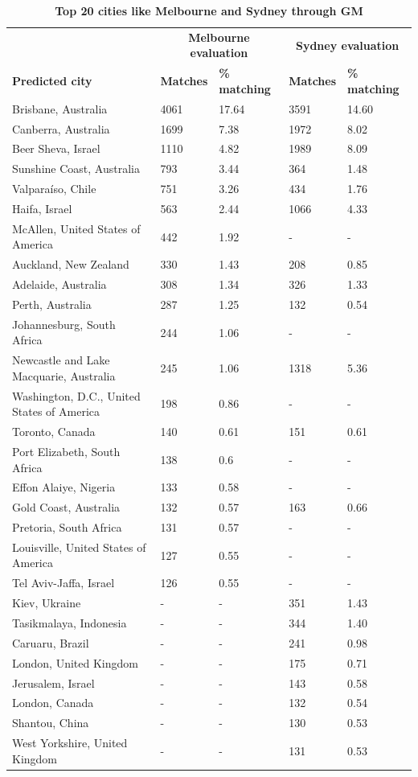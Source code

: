\documentclass[10pt,letterpaper]{article}
\begin{document}
\begin{table}[!htbp]
\begin{adjustwidth}{-2.25in}{0in}
\caption{\bf Top 20 cities like Melbourne and Sydney through GM \label{tab:melbournesydneyGM}}     
\begin{tabular}{ l l l l l}
 \hline    &  \multicolumn{2}{c}{\textbf{Melbourne evaluation}} & \multicolumn{2}{c}{\textbf{Sydney evaluation}}  \\  
\textbf{Predicted city} & \textbf{Matches} & \textbf{\% matching}  & \textbf{Matches} & \textbf{\% matching}\\ \hline
Brisbane, Australia & 4061 & 17.64 & 3591 & 14.60      \\ 
Canberra, Australia & 1699 & 7.38  & 1972 & 8.02     \\ 
Beer Sheva, Israel & 1110 & 4.82  & 1989 & 8.09   \\ 
Sunshine Coast, Australia & 793 & 3.44  & 364 & 1.48 \\ 
Valpara\'{i}so, Chile & 751 & 3.26  & 434 & 1.76 \\ 
Haifa, Israel & 563 & 2.44  & 1066 & 4.33 \\
McAllen, United States of America & 442 & 1.92  &-&- \\ 
Auckland, New Zealand & 330 & 1.43  & 208 & 0.85 \\ 
Adelaide, Australia & 308 & 1.34  & 326 & 1.33 \\ 
Perth, Australia & 287 & 1.25  & 132 & 0.54 \\ 
Johannesburg, South Africa & 244 & 1.06  &-&- \\ 
Newcastle and Lake Macquarie, Australia & 245 & 1.06  & 1318 & 5.36   \\ 
Washington, D.C., United States of America & 198 & 0.86  &-&- \\ 
Toronto, Canada & 140 & 0.61  & 151 & 0.61 \\ 
Port Elizabeth, South Africa & 138 & 0.6  &-&- \\
Effon Alaiye, Nigeria & 133 & 0.58  &-&- \\ 
Gold Coast, Australia & 132 & 0.57  & 163 & 0.66 \\ 
Pretoria, South Africa & 131 & 0.57  &-&- \\ 
Louisville, United States of America & 127 & 0.55  &-&- \\ 
Tel Aviv-Jaffa, Israel & 126 & 0.55  &-&- \\ 
Kiev, Ukraine &-&- & 351 & 1.43\\ 
Tasikmalaya, Indonesia&-&- & 344 & 1.40\\
Caruaru, Brazil &-&- & 241 & 0.98\\ 
London, United Kingdom &-&- & 175 & 0.71\\ 
Jerusalem, Israel&-&- & 143 & 0.58\\ 
London, Canada &-&-& 132 & 0.54\\ 
Shantou, China&-&- & 130 & 0.53\\ 
West Yorkshire, United Kingdom&-&- & 131 & 0.53\\ \hline
\end{tabular}
\end{adjustwidth}
\end{table}
\end{document}
